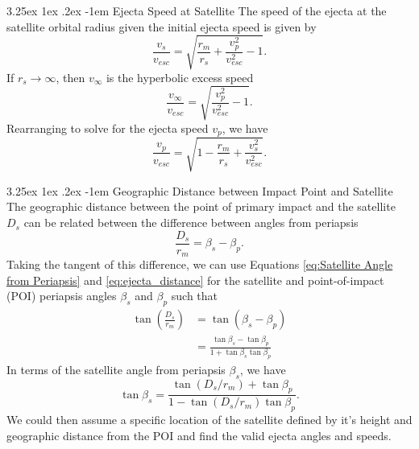 \documentclass{hitec}
\makeatletter
\numberwithin{equation}{section}
\renewcommand\paragraph{\@startsection{paragraph}{5}{\z@}%
	{3.25ex \@plus1ex \@minus.2ex}%
	{-1em}%
	{\normalfont\normalsize\bfseries}}
\makeatother
\begin{document}
\paragraph{Ejecta Speed at Satellite}
The speed of the ejecta at the satellite orbital radius given the initial ejecta speed is given by
\begin{equation}
\frac{v_s}{v_{esc}} = \sqrt{\frac{r_m}{r_s}+\frac{v_p^2}{v_{esc}^2}-1}.
\end{equation}
If $r_s\to\infty$, then $v_\infty$ is the hyperbolic excess speed
\begin{equation}
\frac{v_\infty}{v_{esc}} = \sqrt{\frac{v_p^2}{v_{esc}^2}-1}.
\end{equation}
Rearranging to solve for the ejecta speed $v_p$, we have
\begin{equation}
\frac{v_p}{v_{esc}} = \sqrt{1-\frac{r_m}{r_s}+\frac{v_s^2}{v_{esc}^2}}.
\end{equation}

\paragraph{Geographic Distance between Impact Point and Satellite}
The geographic distance between the point of primary impact and the satellite $D_s$ can be related between the difference between angles from periapsis
\begin{equation}
\frac{D_s}{r_m} = \beta_s - \beta_p.
\end{equation}
Taking the tangent of this difference, we can use Equations \eqref{eq:Satellite Angle from Periapsis} and \eqref{eq:ejecta_distance} for the satellite and point-of-impact (POI) periapsis angles $\beta_s$ and $\beta_p$ such that
\begin{align}
\tan\left(\frac{D_s}{r_m}\right) &= \tan(\beta_s - \beta_p)\nonumber\\
&= \frac{\tan\beta_s - \tan\beta_p}{1 + \tan\beta_s\tan\beta_p}
\end{align}
In terms of the satellite angle from periapsis $\beta_s$, we have
\begin{equation}
\tan\beta_s = \frac{\tan(D_s/r_m) + \tan\beta_p}{1 - \tan(D_s/r_m)\tan\beta_p}.
\end{equation}
We could then assume a specific location of the satellite defined by it's height and geographic distance from the POI and find the valid ejecta angles and speeds.




\cleardoublepage
{}
{}


\end{document}
